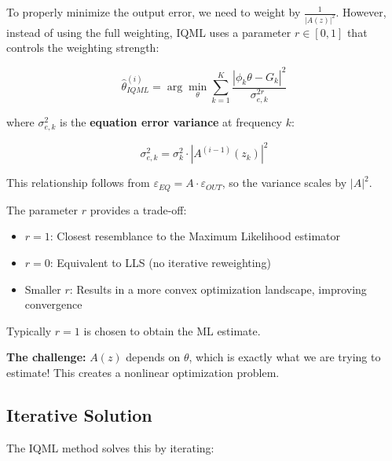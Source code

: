 To properly minimize the output error, we need to weight by $\frac{1}{|A(z)|^2}$. However, instead of using the full weighting, IQML uses a parameter $r \in [0, 1]$ that controls the weighting strength:

\begin{equation}
    \hat{\theta}_{IQML}^{(i)} = \arg\min_\theta \sum_{k=1}^{K} \frac{\left| \phi_k \theta - G_k \right|^2}{\sigma_{e,k}^{2r}}
    \label{eq:iqml_cost}
\end{equation}

where $\sigma_{e,k}^2$ is the \textbf{equation error variance} at frequency $k$:

\begin{equation}
    \sigma_{e,k}^2 = \sigma_k^2 \cdot \left|A^{(i-1)}(z_k)\right|^2
    \label{eq:equation_error_variance}
\end{equation}

This relationship follows from $\varepsilon_{EQ} = A \cdot \varepsilon_{OUT}$, so the variance scales by $|A|^2$.

The parameter $r$ provides a trade-off:
\begin{itemize}
    \item $r = 1$: Closest resemblance to the Maximum Likelihood estimator
    \item $r = 0$: Equivalent to LLS (no iterative reweighting)
    \item Smaller $r$: Results in a more convex optimization landscape, improving convergence
\end{itemize}

Typically $r = 1$ is chosen to obtain the ML estimate.

\textbf{The challenge:} $A(z)$ depends on $\theta$, which is exactly what we are trying to estimate! This creates a nonlinear optimization problem.

\subsection{Iterative Solution}

The IQML method solves this by iterating:

